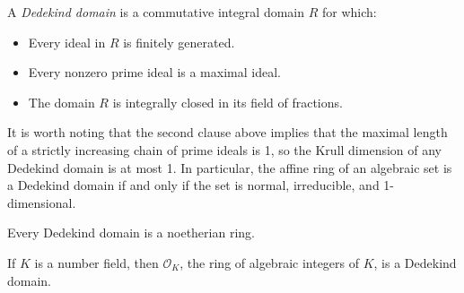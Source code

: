 \documentclass[12pt]{article}
\begin{document}
A {\em Dedekind domain} is a commutative integral domain $R$ for which:
  \begin{itemize}
  \item Every ideal in $R$ is finitely generated.
  \item Every nonzero prime ideal is a maximal ideal.
  \item The domain $R$ is integrally closed in its field of fractions.
  \end{itemize}

It is worth noting that the second clause above implies that the maximal length of a strictly increasing chain of prime ideals is 1, so the Krull dimension of any Dedekind domain is at most 1.  In particular, the affine ring of an algebraic set is a Dedekind domain if and only if the set is normal, irreducible, and 1-dimensional.

Every Dedekind domain is a noetherian ring.

If $K$ is a number field, then $\mathcal{O}_K$, the ring of algebraic integers of $K$, is a Dedekind domain.
\end{document}
